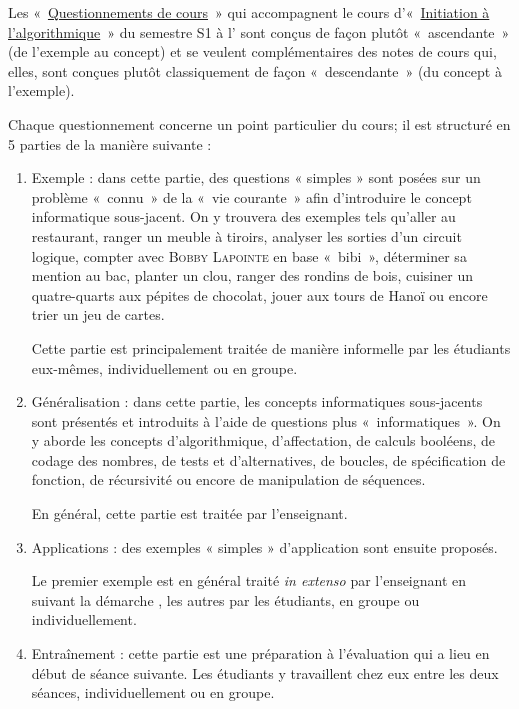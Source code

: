 \documentclass[11pt,a4paper,colorlinks,breaklinks]{article}
\begin{document}
Les «~\href{http://www.enib.fr/~tisseau/pdf/course/q-info-S1.pdf}{Questionnements de cours}~» qui accompagnent le cours d'«~\href{http://www.enib.fr/~tisseau/pdf/course/info-S1.pdf}{Initiation à l'algorithmique}~» du semestre S1 à l'\enib{} sont conçus de façon plutôt «~ascendante~» (de l'exemple au concept) et se veulent complémentaires des notes de cours qui, elles, sont conçues plutôt classiquement de façon «~descendante~» (du concept à l'exemple).

Chaque questionnement concerne un point particulier du cours; il est structuré en 5 parties de la manière suivante :\begin{enumerate}
\item Exemple : dans cette partie, des questions « simples » sont posées sur un problème «~connu~» de la «~vie courante~» afin d'introduire le concept informatique sous-jacent. On y trouvera des exemples tels qu'aller au restaurant, ranger un meuble à tiroirs, analyser les sorties d'un circuit logique, compter avec \textsc{Bobby Lapointe} en base «~bibi~», déterminer sa mention au bac, planter un clou, ranger des rondins de bois, cuisiner un quatre-quarts aux pépites de chocolat, jouer aux tours de Hanoï ou encore trier un jeu de cartes.
		
Cette partie est principalement traitée de manière informelle par les étudiants eux-mêmes, individuellement ou en groupe.
		
\item Généralisation : dans cette partie, les concepts informatiques sous-jacents sont présentés et introduits à l'aide de questions plus «~informatiques~». On y aborde les concepts d'algorithmique, d'affectation, de calculs booléens, de codage des nombres, de tests et d'alternatives, de boucles, de spécification de fonction, de récursivité ou encore     de manipulation de séquences.

En général, cette partie est traitée par l'enseignant.
	
\item Applications : des exemples « simples » d'application sont ensuite proposés.

	Le premier exemple est en général traité \emph{in extenso} par l'enseignant en suivant la démarche \mvr, les autres	par les étudiants, en groupe ou individuellement.
	
\item Entraînement : cette partie est une préparation à l'évaluation qui a lieu en début de séance suivante. Les étudiants y travaillent chez eux entre les deux séances, individuellement ou en groupe.
	

\end{enumerate}
\end{document}
